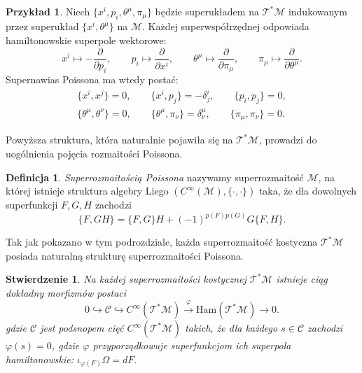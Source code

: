 \documentclass[11pt,a4paper]{report}
\newtheorem{proposition}[theorem]{Stwierdzenie}
\theoremstyle{definition}
\newtheorem{example}[theorem]{Przykład}
\newtheorem{definition}[theorem]{Definicja}
\begin{document}
\begin{example}
	Niech $\{ x^i, p_i, \theta^\mu, \pi_\mu \}$ będzie superukładem na $\mathcal{T^*M}$ indukowanym przez superukład $\{ x^i, \theta^\mu \}$ na $\mathcal{M}$. Każdej superwspółrzędnej odpowiada hamiltonowskie superpole wektorowe:
	\begin{equation*}
		x^i \mapsto -\frac{\partial}{\partial p_i}, \qquad p_i \mapsto \frac{\partial}{\partial x^i}, \qquad
		\theta^\mu \mapsto \frac{\partial}{\partial \pi_\mu}, \qquad \pi_\mu \mapsto \frac{\partial}{\partial \theta^\mu}.
	\end{equation*}
	Supernawias Poissona ma wtedy postać:
	\begin{equation*}
		\begin{gathered}
			\{x^i, x^j \} = 0, \qquad \{ x^i, p_j \} = - \delta^i_j, \qquad \{ p_i, p_j\} = 0, \\
			\{ \theta^\mu, \theta^\nu \} = 0, \qquad \{ \theta^\mu, \pi_\nu \} = \delta^\mu _\nu, \qquad \{ \pi_\mu, \pi_\nu \} = 0.
		\end{gathered}
	\end{equation*}
\end{example}
			      				
Powyższa struktura, która naturalnie pojawiła się na $\mathcal{T^*M}$, prowadzi do uogólnienia pojęcia rozmaitości Poissona.
			      				
\begin{definition}
	\textit{Superrozmaitością Poissona} nazywamy superrozmaitość $\mathcal{M}$, na której istnieje struktura algebry Liego $(C^\infty (\mathcal{M}), \{ \cdot, \cdot \})$ taka, że dla dowolnych superfunkcji $F,G,H$ zachodzi
	\begin{equation*}
		\{ F, GH \} = \{F,G\} H + (-1)^{p(F)p(G)} G \{ F,H\}.
	\end{equation*}
\end{definition}
			      				
Tak jak pokazano w tym podrozdziale, każda superrozmaitość kostyczna $\mathcal{T^*M}$ posiada naturalną strukturę superrozmaitości Poissona.
			      				
\begin{proposition}
	Na każdej superrozmaitości kostycznej $\mathcal{T^*M}$ istnieje ciąg dokładny morfizmów postaci
	\begin{equation*}
		0 \hookrightarrow \mathcal{C} \hookrightarrow C^\infty(\mathcal{T^*M}) \stackrel{\varphi}{\longrightarrow} \mathrm{Ham} (\mathcal{T^*M}) \rightarrow 0.
	\end{equation*}
	gdzie $\mathcal{C}$ jest podsnopem cięć $C^\infty (\mathcal{T^*M})$ takich, że dla każdego $s \in \mathcal{C}$ zachodzi $\varphi(s) = 0$, gdzie $\varphi$ przyporządkowuje superfunkcjom ich superpola hamiltonowskie: $\iota_{\varphi (F)} \Omega = dF$.
\end{proposition}
			      				
\end{document}

